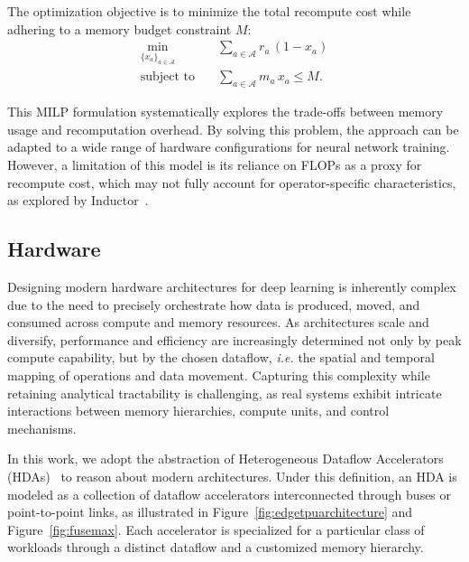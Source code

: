 \documentclass[lettersize,journal]{IEEEtran}
\begin{document}
The optimization objective is to minimize the total recompute cost while adhering to a memory budget constraint \( M \):
\begin{equation}\label{eq:MILP}
\begin{aligned}
\min_{\{x_a\}_{a \in \mathcal{A}}} \quad & \sum_{a \in \mathcal{A}} r_a \, (1 - x_a) \\
\text{subject to} \quad & \sum_{a \in \mathcal{A}} m_a \, x_a \le M.
\end{aligned}
\end{equation}

This MILP formulation systematically explores the trade-offs between memory usage and recomputation overhead.
By solving this problem, the approach can be adapted to a wide range of hardware configurations for neural network training.
However, a limitation of this model is its reliance on FLOPs as a proxy for recompute cost, which may not fully account for operator-specific characteristics, as explored by Inductor~\cite{pytorch_mincut_2022}.

\subsection{Hardware}
Designing modern hardware architectures for deep learning is inherently complex due to the need to precisely orchestrate how data is produced, moved, and consumed across compute and memory resources. As architectures scale and diversify, performance and efficiency are increasingly determined not only by peak compute capability, but by the chosen dataflow, \emph{i.e.} the spatial and temporal mapping of operations and data movement. Capturing this complexity while retaining analytical tractability is challenging, as real systems exhibit intricate interactions between memory hierarchies, compute units, and control mechanisms.

In this work, we adopt the abstraction of Heterogeneous Dataflow Accelerators (HDAs)~\cite{kwon2021HDA} to reason about modern architectures. Under this definition, an HDA is modeled as a collection of dataflow accelerators interconnected through buses or point-to-point links, as illustrated in Figure~\ref{fig:edgetpuarchitecture} and Figure~\ref{fig:fusemax}. Each accelerator is specialized for a particular class of workloads through a distinct dataflow and a customized memory hierarchy.
\end{document}
